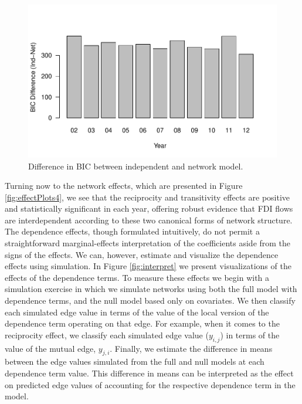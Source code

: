 \documentclass[reqno,onecolumn,letterpaper,12pt]{article}
\begin{document}
\begin{figure}[!h]
\centering
\includegraphics[scale=.75]{draft_figures/BICdiff.pdf} \vspace{-.5cm}
\caption{\label{fig:bic} Difference in BIC between independent and network model.}
\end{figure}

Turning now to the network effects, which are presented in Figure \ref{fig:effectPlots4}, we see that the reciprocity and transitivity effects are positive and statistically significant in each year, offering robust evidence that FDI flows are interdependent according to these two canonical forms of network structure. The dependence effects, though formulated intuitively, do not permit a straightforward marginal-effects interpretation of the coefficients aside from the signs of the effects. We can, however, estimate and visualize the dependence effects using simulation. In Figure \ref{fig:interpret} we present visualizations of the effects of the dependence terms. To measure these effects we begin with a simulation exercise in which we simulate networks using both the full model with dependence terms, and the null model based only on covariates. We then classify each simulated edge value in terms of the value of the local version of the dependence term operating on that edge. For example, when it comes to the reciprocity effect, we classify each simulated edge value ($y_{i,j}$) in terms of the value of the mutual edge, $y_{j,i}$. Finally, we estimate the difference in means between the edge values simulated from the full and null models at each dependence term value. This difference in means can be interpreted as the effect on predicted edge values of accounting for the respective dependence term in the model.  
\end{document}
